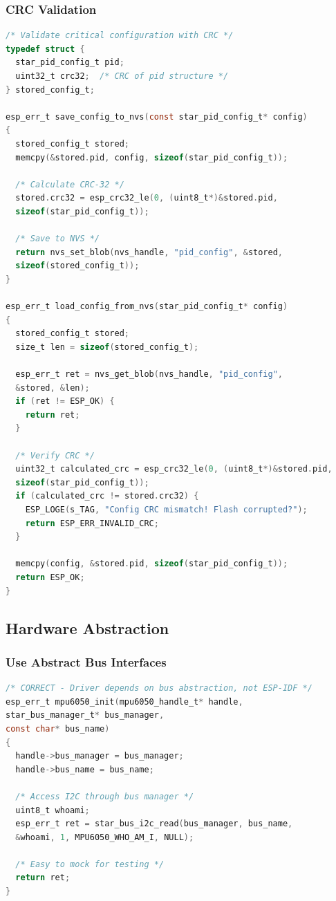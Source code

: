 \subsubsection{CRC Validation}

\begin{lstlisting}[language=C]
/* Validate critical configuration with CRC */
typedef struct {
  star_pid_config_t pid;
  uint32_t crc32;  /* CRC of pid structure */
} stored_config_t;

esp_err_t save_config_to_nvs(const star_pid_config_t* config)
{
  stored_config_t stored;
  memcpy(&stored.pid, config, sizeof(star_pid_config_t));
  
  /* Calculate CRC-32 */
  stored.crc32 = esp_crc32_le(0, (uint8_t*)&stored.pid,
  sizeof(star_pid_config_t));
  
  /* Save to NVS */
  return nvs_set_blob(nvs_handle, "pid_config", &stored,
  sizeof(stored_config_t));
}

esp_err_t load_config_from_nvs(star_pid_config_t* config)
{
  stored_config_t stored;
  size_t len = sizeof(stored_config_t);
  
  esp_err_t ret = nvs_get_blob(nvs_handle, "pid_config",
  &stored, &len);
  if (ret != ESP_OK) {
    return ret;
  }
  
  /* Verify CRC */
  uint32_t calculated_crc = esp_crc32_le(0, (uint8_t*)&stored.pid,
  sizeof(star_pid_config_t));
  if (calculated_crc != stored.crc32) {
    ESP_LOGE(s_TAG, "Config CRC mismatch! Flash corrupted?");
    return ESP_ERR_INVALID_CRC;
  }
  
  memcpy(config, &stored.pid, sizeof(star_pid_config_t));
  return ESP_OK;
}


\end{lstlisting}
\subsection{Hardware Abstraction}

\subsubsection{Use Abstract Bus Interfaces}

\begin{lstlisting}[language=C]
/* CORRECT - Driver depends on bus abstraction, not ESP-IDF */
esp_err_t mpu6050_init(mpu6050_handle_t* handle,
star_bus_manager_t* bus_manager,
const char* bus_name)
{
  handle->bus_manager = bus_manager;
  handle->bus_name = bus_name;
  
  /* Access I2C through bus manager */
  uint8_t whoami;
  esp_err_t ret = star_bus_i2c_read(bus_manager, bus_name,
  &whoami, 1, MPU6050_WHO_AM_I, NULL);
  
  /* Easy to mock for testing */
  return ret;
}


\end{lstlisting}
